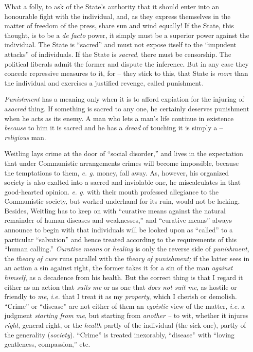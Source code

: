 \documentclass[12pt,a4paper]{book}
\begin{document}
What a folly, to ask of the State's authority that it should enter into an 
honourable fight with the individual, and, as they express themselves in the 
matter of freedom of the press, share sun and wind equally! If the State, this 
thought, is to be a \textit{de facto} power, it simply must be a superior 
power against the individual. The State is ``sacred'' and must not expose 
itself to the ``impudent attacks'' of individuals. If the State is 
\textit{sacred}, there must be censorship. The political liberals admit the 
former and dispute the inference. But in any case they concede repressive 
measures to it, for -- they stick to this, that State is \textit{more} than 
the individual and exercises a justified revenge, called punishment.

\textit{Punishment} has a meaning only when it is to afford expiation for the 
injuring of a\textit{sacred} thing. If something is sacred to any one, he 
certainly deserves punishment when he acts as its enemy. A man who lets a 
man's life continue in existence \textit{because} to him it is sacred and he 
has a \textit{dread} of touching it is simply a -- \textit{religious} man.

Weitling lays crime at the door of ``social disorder,'' and lives in the 
expectation that under Communistic arrangements crimes will become impossible, 
because the temptations to them, \textit{e. g.} money, fall away. As, however, 
his organized society is also exalted into a sacred and inviolable one, he 
miscalculates in that good-hearted opinion. \textit{e. g.} with their mouth 
professed allegiance to the Communistic society, but worked underhand for its 
ruin, would not be lacking. Besides, Weitling has to keep on with ``curative 
means against the natural remainder of human diseases and weaknesses,'' and 
``curative means'' always announce to begin with that individuals will be 
looked upon as ``called'' to a particular ``salvation'' and hence treated 
according to the requirements of this ``human calling.'' \textit{Curative 
means} or \textit{healing} is only the reverse side of \textit{punishment}, 
the \textit{theory of cure} runs parallel with the \textit{theory of 
punishment;} if the latter sees in an action a sin against right, the former 
takes it for a sin of the man \textit{against himself}, as a decadence from 
his health. But the correct thing is that I regard it either as an action that 
\textit{suits me} or as one that \textit{does not suit me}, as hostile or 
friendly to \textit{me}, \textit{i.e.} that I treat it as my 
\textit{property}, which I cherish or demolish. ``Crime'' or ``disease'' 
are not either of them an \textit{egoistic} view of the matter, \textit{i.e.} 
a judgment \textit{starting from me}, but starting from \textit{another --} to 
wit, whether it injures \textit{right}, general right, or the \textit{health} 
partly of the individual (the sick one), partly of the generality 
(\textit{society}). ``Crime'' is treated inexorably, ``disease'' with 
``loving gentleness, compassion,'' etc.
\end{document}
